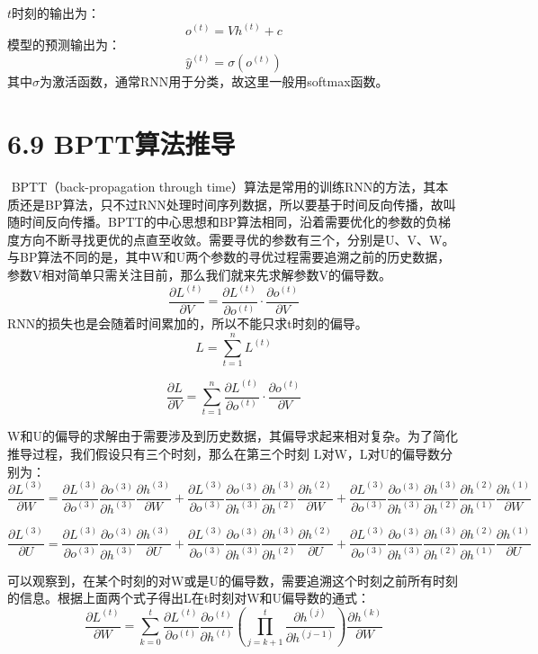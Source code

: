 \(t\)时刻的输出为： \[
o^{(t)}=Vh^{(t)}+c
\] 模型的预测输出为： \[
\widehat{y}^{(t)}=\sigma(o^{(t)})
\] 其中\(\sigma​\)为激活函数，通常RNN用于分类，故这里一般用softmax函数。

\section{6.9 BPTT算法推导}\label{bpttux7b97ux6cd5ux63a8ux5bfc}

​ BPTT（back-propagation through
time）算法是常用的训练RNN的方法，其本质还是BP算法，只不过RNN处理时间序列数据，所以要基于时间反向传播，故叫随时间反向传播。BPTT的中心思想和BP算法相同，沿着需要优化的参数的负梯度方向不断寻找更优的点直至收敛。需要寻优的参数有三个，分别是U、V、W。与BP算法不同的是，其中W和U两个参数的寻优过程需要追溯之前的历史数据，参数V相对简单只需关注目前，那么我们就来先求解参数V的偏导数。
\[
\frac{\partial L^{(t)}}{\partial V}=\frac{\partial L^{(t)}}{\partial o^{(t)}}\cdot \frac{\partial o^{(t)}}{\partial V}
\] RNN的损失也是会随着时间累加的，所以不能只求t时刻的偏导。 \[
L=\sum_{t=1}^{n}L^{(t)}
\]

\[
\frac{\partial L}{\partial V}=\sum_{t=1}^{n}\frac{\partial L^{(t)}}{\partial o^{(t)}}\cdot \frac{\partial o^{(t)}}{\partial V}
\]

​
W和U的偏导的求解由于需要涉及到历史数据，其偏导求起来相对复杂。为了简化推导过程，我们假设只有三个时刻，那么在第三个时刻
L对W，L对U的偏导数分别为： \[
\frac{\partial L^{(3)}}{\partial W}=\frac{\partial L^{(3)}}{\partial o^{(3)}}\frac{\partial o^{(3)}}{\partial h^{(3)}}\frac{\partial h^{(3)}}{\partial W}+\frac{\partial L^{(3)}}{\partial o^{(3)}}\frac{\partial o^{(3)}}{\partial h^{(3)}}\frac{\partial h^{(3)}}{\partial h^{(2)}}\frac{\partial h^{(2)}}{\partial W}+\frac{\partial L^{(3)}}{\partial o^{(3)}}\frac{\partial o^{(3)}}{\partial h^{(3)}}\frac{\partial h^{(3)}}{\partial h^{(2)}}\frac{\partial h^{(2)}}{\partial h^{(1)}}\frac{\partial h^{(1)}}{\partial W}
\]

\[
\frac{\partial L^{(3)}}{\partial U}=\frac{\partial L^{(3)}}{\partial o^{(3)}}\frac{\partial o^{(3)}}{\partial h^{(3)}}\frac{\partial h^{(3)}}{\partial U}+\frac{\partial L^{(3)}}{\partial o^{(3)}}\frac{\partial o^{(3)}}{\partial h^{(3)}}\frac{\partial h^{(3)}}{\partial h^{(2)}}\frac{\partial h^{(2)}}{\partial U}+\frac{\partial L^{(3)}}{\partial o^{(3)}}\frac{\partial o^{(3)}}{\partial h^{(3)}}\frac{\partial h^{(3)}}{\partial h^{(2)}}\frac{\partial h^{(2)}}{\partial h^{(1)}}\frac{\partial h^{(1)}}{\partial U}
\]

可以观察到，在某个时刻的对W或是U的偏导数，需要追溯这个时刻之前所有时刻的信息。根据上面两个式子得出L在t时刻对W和U偏导数的通式：
\[
\frac{\partial L^{(t)}}{\partial W}=\sum_{k=0}^{t}\frac{\partial L^{(t)}}{\partial o^{(t)}}\frac{\partial o^{(t)}}{\partial h^{(t)}}(\prod_{j=k+1}^{t}\frac{\partial h^{(j)}}{\partial h^{(j-1)}})\frac{\partial h^{(k)}}{\partial W}
\]

